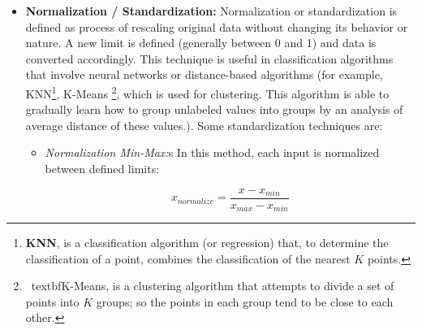\begin{itemize}
\item \textbf{Normalization / Standardization:} Normalization or standardization is defined as process of rescaling original data without changing its behavior or nature. A new limit is defined (generally between 0 and 1) and data is converted accordingly. This technique is useful in classification algorithms that involve neural networks or distance-based algorithms (for example, KNN\footnote {\textbf{KNN}, is a classification algorithm (or regression) that, to determine the classification of a point, combines the classification of the nearest $K$ points.}, K-Means \footnote {\ textbf{K-Means}, is a clustering algorithm that attempts to divide a set of points into $K$ groups; so the points in each group tend to be close to each other.}, which is used for clustering. This algorithm is able to gradually learn how to group unlabeled values into groups by an analysis of average distance of these values.). Some standardization techniques are:
\begin{itemize}
\item \textit{Normalization Min-Max:}s In this method, each input is normalized between defined limits:

\begin{equation}
x_{normalize} = \frac{x - x_{min}}{x_{max}-x_{min}}
\end{equation}


\end{itemize}
\end{itemize}
